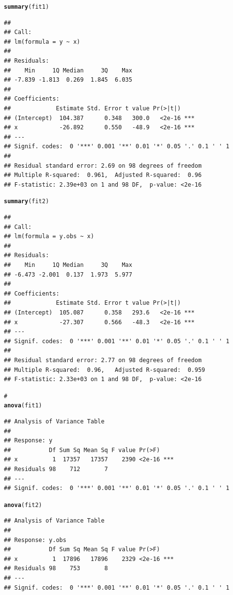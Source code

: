 \documentclass{article}\usepackage[]{graphicx}\usepackage[]{color}
\makeatletter
\newcommand{\hlcom}[1]{\textcolor[rgb]{0.678,0.584,0.686}{\textit{#1}}}%
\newcommand{\hlstd}[1]{\textcolor[rgb]{0.345,0.345,0.345}{#1}}%
\newcommand{\hlkwd}[1]{\textcolor[rgb]{0.737,0.353,0.396}{\textbf{#1}}}%
\newenvironment{kframe}{%
 \def\at@end@of@kframe{}%
 \ifinner\ifhmode%
  \def\at@end@of@kframe{\end{minipage}}%
  \begin{minipage}{\columnwidth}%
 \fi\fi%
 \def\FrameCommand##1{\hskip\@totalleftmargin \hskip-\fboxsep
 \colorbox{shadecolor}{##1}\hskip-\fboxsep
     \hskip-\linewidth \hskip-\@totalleftmargin \hskip\columnwidth}%
 \MakeFramed {\advance\hsize-\width
   \@totalleftmargin\z@ \linewidth\hsize
   \@setminipage}}%
 {\par\unskip\endMakeFramed%
 \at@end@of@kframe}
\newenvironment{knitrout}{}{} %
\makeatother
\begin{document}
\begin{knitrout}
\begin{kframe}
\begin{alltt}
\hlkwd{summary}\hlstd{(fit1)}
\end{alltt}
\begin{verbatim}
## 
## Call:
## lm(formula = y ~ x)
## 
## Residuals:
##    Min     1Q Median     3Q    Max 
## -7.839 -1.813  0.269  1.845  6.035 
## 
## Coefficients:
##             Estimate Std. Error t value Pr(>|t|)    
## (Intercept)  104.387      0.348   300.0   <2e-16 ***
## x            -26.892      0.550   -48.9   <2e-16 ***
## ---
## Signif. codes:  0 '***' 0.001 '**' 0.01 '*' 0.05 '.' 0.1 ' ' 1
## 
## Residual standard error: 2.69 on 98 degrees of freedom
## Multiple R-squared:  0.961,	Adjusted R-squared:  0.96 
## F-statistic: 2.39e+03 on 1 and 98 DF,  p-value: <2e-16
\end{verbatim}
\begin{alltt}
\hlkwd{summary}\hlstd{(fit2)}
\end{alltt}
\begin{verbatim}
## 
## Call:
## lm(formula = y.obs ~ x)
## 
## Residuals:
##    Min     1Q Median     3Q    Max 
## -6.473 -2.001  0.137  1.973  5.977 
## 
## Coefficients:
##             Estimate Std. Error t value Pr(>|t|)    
## (Intercept)  105.087      0.358   293.6   <2e-16 ***
## x            -27.307      0.566   -48.3   <2e-16 ***
## ---
## Signif. codes:  0 '***' 0.001 '**' 0.01 '*' 0.05 '.' 0.1 ' ' 1
## 
## Residual standard error: 2.77 on 98 degrees of freedom
## Multiple R-squared:  0.96,	Adjusted R-squared:  0.959 
## F-statistic: 2.33e+03 on 1 and 98 DF,  p-value: <2e-16
\end{verbatim}
\begin{alltt}
\hlcom{# }
\hlkwd{anova}\hlstd{(fit1)}
\end{alltt}
\begin{verbatim}
## Analysis of Variance Table
## 
## Response: y
##           Df Sum Sq Mean Sq F value Pr(>F)    
## x          1  17357   17357    2390 <2e-16 ***
## Residuals 98    712       7                   
## ---
## Signif. codes:  0 '***' 0.001 '**' 0.01 '*' 0.05 '.' 0.1 ' ' 1
\end{verbatim}
\begin{alltt}
\hlkwd{anova}\hlstd{(fit2)}
\end{alltt}
\begin{verbatim}
## Analysis of Variance Table
## 
## Response: y.obs
##           Df Sum Sq Mean Sq F value Pr(>F)    
## x          1  17896   17896    2329 <2e-16 ***
## Residuals 98    753       8                   
## ---
## Signif. codes:  0 '***' 0.001 '**' 0.01 '*' 0.05 '.' 0.1 ' ' 1
\end{verbatim}

\end{kframe}
\end{knitrout}
\end{document}
